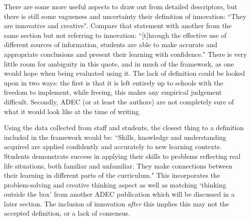 \documentclass[11pt]{article}
\begin{document}
There are some more useful aspects to draw out from detailed descriptors, but there is still some vagueness and uncertainty their definition of innovation: ``They are innovative and creative". Compare that statement with another from the same section but not referring to innovation: ``[t]hrough the effective use of different sources of information, students are able to make accurate and appropriate conclusions and present their learning with confidence." There is very little room for ambiguity in this quote, and in much of the framework, as one would hope when being evaluated using it. The lack of definition could be looked upon in two ways: the first is that it is left entirely up to schools with the freedom to implement, while freeing, this makes any empirical judgement difficult. Secondly, ADEC (or at least the authors) are not completely sure of what it would look like at the time of writing.

Using the data collected from staff and students, the closest thing to a definition included in the framework would be: ``Skills, knowledge and understanding acquired are applied confidently and accurately to new learning contexts. Students demonstrate success in applying their skills to problems reflecting real life situations, both familiar and unfamiliar. They make connections between their learning in different parts of the curriculum." This incorporates the problem-solving and creative thinking aspect as well as matching `thinking outside the box' from another ADEC publication which will be discussed in a later section. The inclusion of innovation \textit{after} this implies this may not the accepted definition, or a lack of consensus.
\end{document}
